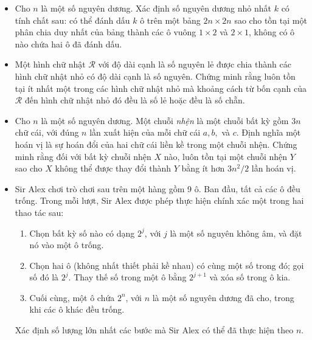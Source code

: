 \documentclass[11pt]{scrartcl}
\begin{document}
\begin{itemize}[label=, leftmargin=0em, itemsep=0.5em]
    \item \begin{btvn}
        Cho $n$ là một số nguyên dương. Xác định số nguyên dương nhỏ nhất $k$ có tính chất sau: có thể đánh dấu $k$ ô trên một bảng $2n \times 2n$ sao cho tồn tại một phân chia duy nhất của bảng thành các ô vuông $1 \times 2$ và $2 \times 1$, không có ô nào chứa hai ô đã đánh dấu.
    \end{btvn}

    \item \begin{btvn}
        Một hình chữ nhật $\mathcal{R}$ với độ dài cạnh là số nguyên lẻ được chia thành các hình chữ nhật nhỏ có độ dài cạnh là số nguyên. Chứng minh rằng luôn tồn tại ít nhất một trong các hình chữ nhật nhỏ mà khoảng cách từ bốn cạnh của $\mathcal{R}$ đến hình chữ nhật nhỏ đó đều là số lẻ hoặc đều là số chẵn.
    \end{btvn}

    \item \begin{btvn}
        Cho $n$ là một số nguyên dương. Một chuỗi \textit{nhện} là một chuỗi bất kỳ gồm $3n$ chữ cái, với đúng $n$ lần xuất hiện của mỗi chữ cái $a, b,$ và $c$. Định nghĩa một hoán vị là sự hoán đổi của hai chữ cái liền kề trong một chuỗi nhện. Chứng minh rằng đối với bất kỳ chuỗi nhện $X$ nào, luôn tồn tại một chuỗi nhện $Y$ sao cho $X$ không thể được thay đổi thành $Y$ bằng ít hơn $3n^2/2$ lần hoán vị.
    \end{btvn}

    \item \begin{btvn}
        Sir Alex chơi trò chơi sau trên một hàng gồm 9 ô. Ban đầu, tất cả các ô đều trống. Trong mỗi lượt, Sir Alex được phép thực hiện chính xác một trong hai thao tác sau:
        \begin{enumerate}
            \item  Chọn bất kỳ số nào có dạng $2^j$, với $j$ là một số nguyên không âm, và đặt nó vào một ô trống.
            \item Chọn hai ô (không nhất thiết phải kề nhau) có cùng một số trong đó; gọi số đó là $2^j$. Thay thế số trong một ô bằng $2^{j+1}$ và xóa số trong ô kia.
            \item Cuối cùng, một ô chứa $2^n$, với $n$ là một số nguyên dương đã cho, trong khi các ô khác đều trống.
        \end{enumerate}
         Xác định số lượng lớn nhất các bước mà Sir Alex có thể đã thực hiện theo $n$.
    \end{btvn}


\end{itemize}
\end{document}
